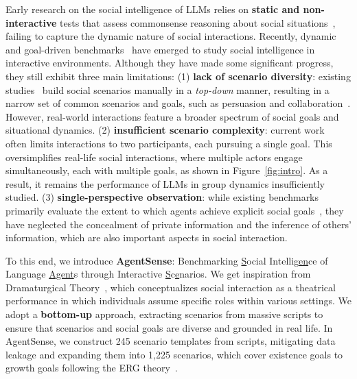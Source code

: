Early research on the social intelligence of LLMs relies on \textbf{static and non-interactive} tests that assess commonsense reasoning about social situations~\cite{sap2019socialiqacommonsensereasoningsocial,Zadeh_2019_CVPR,shapira2023clever,wilf2023social}, failing to capture the dynamic nature of social interactions. Recently, dynamic and goal-driven benchmarks~\cite{zhou2024sotopiainteractiveevaluationsocial, wang2024objectivelybenchmarkingsocialintelligence} have emerged to study social intelligence in interactive environments.
Although they have made some significant progress, they still exhibit three main limitations:
(1) \textbf{lack of scenario diversity}: existing studies~\cite{wang2024objectivelybenchmarkingsocialintelligence,sabour2024emobench} build social scenarios manually in a \textit{top-down} manner, resulting in a narrow set of common scenarios and goals, such as persuasion and collaboration~\cite{li2023camel}.
However, real-world interactions feature a broader spectrum of social goals and situational dynamics.
(2) \textbf{insufficient scenario complexity}: current work~\cite{xie2024largelanguagemodelagents,zhou2024sotopiainteractiveevaluationsocial} often limits interactions to two participants, each pursuing a single goal.
This oversimplifies real-life social interactions, where multiple actors engage simultaneously, each with multiple goals, as shown in Figure~\ref{fig:intro}.
As a result, it remains the performance of LLMs in group dynamics insufficiently studied. 
(3) \textbf{single-perspective observation}: while existing benchmarks primarily evaluate the extent to which agents achieve explicit social goals~\cite{li2023metaagents,wang2024objectivelybenchmarkingsocialintelligence}, they have neglected the concealment of private information and the inference of others' information, which are also important aspects in social interaction.

To this end, we introduce \textbf{AgentSense}: Benchmarking \underline{S}ocial Intellig\underline{en}ce of Language \underline{Agent}s through Interactive \underline{S}c\underline{e}narios.
We get inspiration from Dramaturgical Theory~\cite{goffman1959presentation}, which conceptualizes social interaction as a theatrical performance in which individuals assume specific roles within various settings.
We adopt a \textbf{bottom-up} approach, extracting scenarios from massive scripts to ensure that scenarios and social goals are diverse and grounded in real life.
In AgentSense, we construct 245 scenario templates from scripts, mitigating data leakage and expanding them into 1,225 scenarios, which cover existence goals to growth goals following the ERG theory~\cite{ALDERFER1969142}.

